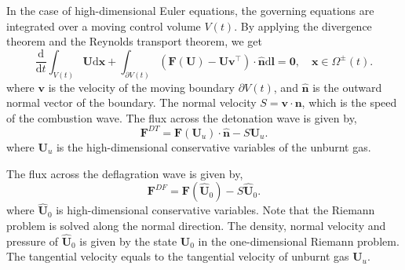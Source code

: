 In the case of high-dimensional Euler equations, the governing equations are integrated over a moving control volume $V(t)$. By applying the divergence theorem and the Reynolds transport theorem, we get 
\begin{equation}
	\frac{\mathrm{d}}{\mathrm{d} t}\int_{V(t)}  \boldsymbol{U} \mathrm{d} \boldsymbol{x} +  \int_{\partial V(t)}\left(\boldsymbol{F}(\boldsymbol{U}) - \boldsymbol{U}\boldsymbol{v}^{\top} \right) \cdot \hat{\boldsymbol{n}} \mathrm{d} \boldsymbol{l} =\boldsymbol{0},\quad \boldsymbol{x} \in \Omega^{\pm}(t).
\label{Equ:IntxEuler}
\end{equation}
where $\boldsymbol{v}$ is the velocity of the moving boundary $\partial V(t)$, and $\hat{\boldsymbol{n}}$ is the outward normal vector of the boundary. 
The normal velocity $S = \boldsymbol{v} \cdot \boldsymbol{n}$, which is the speed of the combustion wave.
The flux across the detonation wave is given by,
\begin{equation}
\boldsymbol{F}^{DT} = \boldsymbol{F}(\boldsymbol{U}_u) \cdot \hat{\boldsymbol{n}} - S \boldsymbol{U}_u.
\end{equation}
where $\boldsymbol{U}_u$ is the high-dimensional conservative variables of the unburnt gas. 

The flux across the deflagration wave is given by,
\begin{equation}
\boldsymbol{F}^{DF} = \boldsymbol{F}(\widehat{\boldsymbol{U}}_0) - S \widehat{\boldsymbol{U}}_0.
\end{equation}
where $\widehat{\boldsymbol{U}}_0$ is high-dimensional conservative variables.
Note that the Riemann problem is solved along the normal direction. The density, normal velocity and pressure of $\widehat{\boldsymbol{U}}_0$ is given by the state $\boldsymbol{U}_0$ in the one-dimensional Riemann problem.
The tangential velocity equals to the tangential velocity of unburnt gas $\boldsymbol{U}_u$. 
